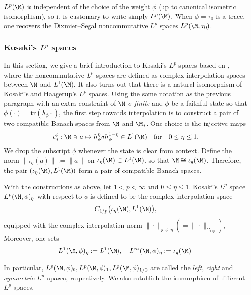 \documentclass[sn-mathphys-num]{sn-jnl}
\begin{document}
\begin{remark}
$L^p(\M)$ is independent of the choice of the weight $\phi$ \cite{haagerup1979lpspaces,Terp1981}(up to canonical isometric isomorphism), so it is customary to write simply $L^p(\M)$.  When $\phi=\tau_0$ is a trace, one recovers the Dixmier--Segal noncommutative $L^p$ spaces $L^p(\M,\tau_0)$.
\end{remark}
\subsubsection{Kosaki's \texorpdfstring{$L^p$}{Lp} spaces} \label{sec:K-Lp}
In this section, we give a brief introduction to Kosaki's $L^p$ spaces based on \cite[Appendix~A.8]{Hiai_2021}, where the noncommutative $L^p$ spaces are defined as complex interpolation spaces between $\M$ and $L^1(\M)$. It also turns out that there is a natural isomorphism \cite[Theorem~9.1]{kosaki_applications_1984} of Kosaki's and Haagerup's $L^p$ spaces. Using the same notation as the previous paragraph with an extra constraint of $\M$ \emph{$\sigma$-finite} and $\phi$ be a faithful state so that $\phi(\cdot)=\mathrm{tr}(h_\phi \cdot)$, the first step towards interpolation is to construct a pair of two compatible Banach spaces from $\M$ and $\M_*$. One choice is the injective maps
\[
    \iota_\eta^\phi: \M\ni a\mapsto h_\phi^{\eta} a h_\phi^{1-\eta}\in L^1(\M)\quad\text{for}\quad 0\le\eta\le 1.
\]
We drop the subscript $\phi$ whenever the state is clear from context.
Define the norm $\|\iota_\eta(a)\|:=\|a\|$ on $\iota_\eta(\M)\subset L^1(\M)$, so that $\M\cong\iota_\eta(\M)$. Therefore, the pair $(\iota_\eta(\M),L^1(\M))$ form a pair of compatible Banach spaces.
\begin{definition}\label{def:k-lp}
With the constructions as above,
let $1<p<\infty$ and $0\le\eta\le1$.  Kosaki's $L^p$ space $L^p(\M,\phi)_\eta$ with respect to $\phi$ is defined to be the complex interpolation space \cite[Section~I.1]{kosaki_applications_1984}
\[  C_{1/p}\bigl(\iota_\eta(\M), L^1(\M)\bigr),
\]
equipped with the complex interpolation norm
$\|\cdot\|_{p,\phi,\eta} (=\|\cdot\|_{C_{1/p}})$, Moreover, one sets
\[
  L^1(\M,\phi)_\eta := L^1(\M),
  \quad
  L^\infty(\M,\phi)_\eta := \iota_\eta(\M).
\]
\end{definition}
In particular, $  L^p(\M,\phi)_0,
  L^p(\M,\phi)_1,
  L^p(\M,\phi)_{1/2}$
are called the \emph{left}, \emph{right} and \emph{symmetric} $L^p$--spaces, respectively. We also establish the isomorphism of different $L^p$ spaces.
\end{document}
